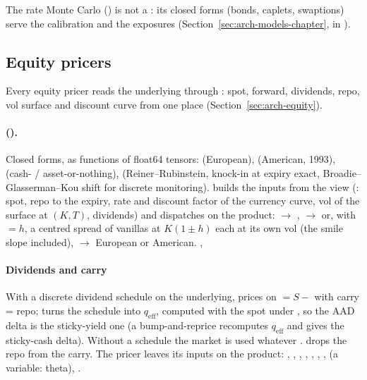 The rate Monte Carlo () is not a : its closed forms (bonds, caplets,
swaptions) serve the calibration and the exposures (Section~\ref{sec:arch-models-chapter},
 in ).

\subsection{Equity pricers}\label{sec:arch-equity-pricers}
Every equity pricer reads the underlying through : spot, forward,
dividends, repo, vol surface and discount curve from one place (Section~\ref{sec:arch-equity}).

\paragraph{ ().} Closed forms, as functions of float64 tensors:
 (European),  (American, 1993),  (cash- /
asset-or-nothing),  (Reiner--Rubinstein, knock-in at expiry exact, Broadie--Glasserman--Kou shift
for discrete monitoring).  builds the inputs from the  view (: spot, repo to the
expiry, rate and discount factor of the currency curve, vol of the surface at $(K, T)$, dividends) and dispatches on
the product:  $\to$ ,  $\to$  or, with
 $= h$, a centred spread of vanillas at $K(1 \pm h)$ each at its own vol (the smile slope
included),  $\to$ European or American. , 

\paragraph{Dividends and carry}\label{sec:arch-bs-dividends} With a discrete dividend schedule on the underlying,
 prices on  $= S - $  with carry = repo;
 turns the schedule into $q_{\mathrm{eff}}$, computed with the spot under , so
the AAD delta is the sticky-yield one (a bump-and-reprice recomputes $q_{\mathrm{eff}}$ and gives the sticky-cash
delta). Without a schedule the market  is used whatever .
 drops the repo from the carry. The pricer leaves its inputs on the product:
, , , , ,
, ,  (a variable: theta), .

